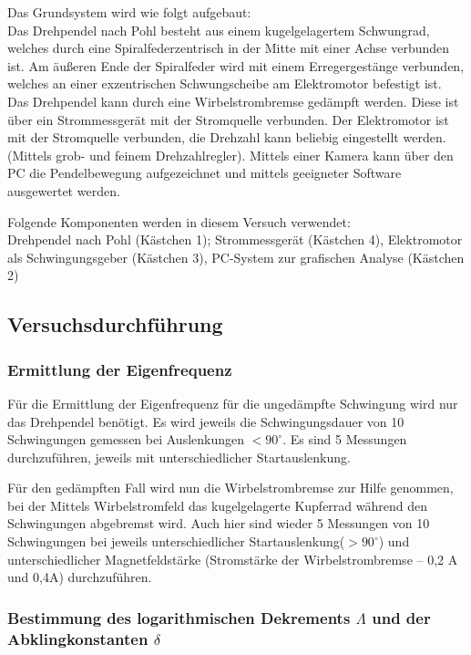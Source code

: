 \documentclass[fontsize=12pt]{scrartcl}
\begin{document}
Das Grundsystem wird wie folgt aufgebaut:\\
Das Drehpendel nach Pohl besteht aus einem kugelgelagertem Schwungrad, welches durch eine Spiralfederzentrisch in der Mitte mit einer Achse verbunden ist. Am äußeren Ende der Spiralfeder wird mit einem Erregergestänge verbunden, welches an einer exzentrischen Schwungscheibe am Elektromotor befestigt ist. 
Das Drehpendel kann durch eine Wirbelstrombremse gedämpft werden. Diese ist über ein Strommessgerät mit der Stromquelle verbunden. 
Der Elektromotor ist mit der Stromquelle verbunden, die Drehzahl kann beliebig eingestellt werden. (Mittels grob- und feinem Drehzahlregler).
Mittels einer Kamera kann über den PC die Pendelbewegung aufgezeichnet und mittels geeigneter Software ausgewertet werden. \par

Folgende Komponenten werden in diesem Versuch verwendet: \\
Drehpendel nach Pohl (Kästchen 1); Strommessgerät (Kästchen 4), Elektromotor als Schwingungsgeber (Kästchen 3), PC-System zur grafischen Analyse (Kästchen 2)

\subsection{Versuchsdurchführung}

\subsubsection{Ermittlung der Eigenfrequenz}

Für die Ermittlung der Eigenfrequenz für die ungedämpfte Schwingung wird nur das Drehpendel benötigt. Es wird jeweils die Schwingungsdauer von 10 Schwingungen gemessen bei Auslenkungen $<90^{\circ}$. Es sind 5 Messungen durchzuführen, jeweils mit unterschiedlicher Startauslenkung.\par

Für den gedämpften Fall wird nun die Wirbelstrombremse zur Hilfe genommen, bei der Mittels Wirbelstromfeld das kugelgelagerte Kupferrad während den Schwingungen abgebremst wird. Auch hier sind wieder 5 Messungen von 10 Schwingungen bei jeweils unterschiedlicher Startauslenkung($>90^{\circ}$) und unterschiedlicher Magnetfeldstärke (Stromstärke der Wirbelstrombremse – 0,2 A und 0,4A) durchzuführen.	

\subsubsection{Bestimmung des logarithmischen Dekrements $\Lambda$ und der Abklingkonstanten $\delta$}
\end{document}
